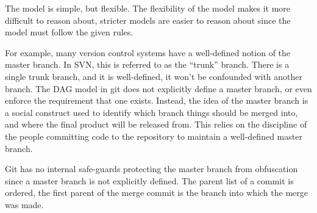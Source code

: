 The model is simple, but flexible.
The flexibility of the model makes it more difficult to reason about,
stricter models are easier to reason about since the model must follow
the given rules.

For example, many version control systems have a well-defined notion of
the master branch.
In SVN, this is referred to as the ``trunk'' branch.
There is a single trunk branch, and it is well-defined, it won't be
confounded with another branch.
The DAG model in git does not explicitly define a master branch, or even
enforce the requirement that one exists.
Instead, the idea of the master branch is a social construct used to
identify which branch things should be merged into, and where the final
product will be released from.
This relies on the discipline of the people committing code to the
repository to maintain a well-defined master branch.

Git has no internal safe-guards protecting the master branch from
obfuscation since a master branch is not explicitly defined.
The parent list of a commit is ordered, the first parent of the merge
commit is the branch into which the merge was made.

